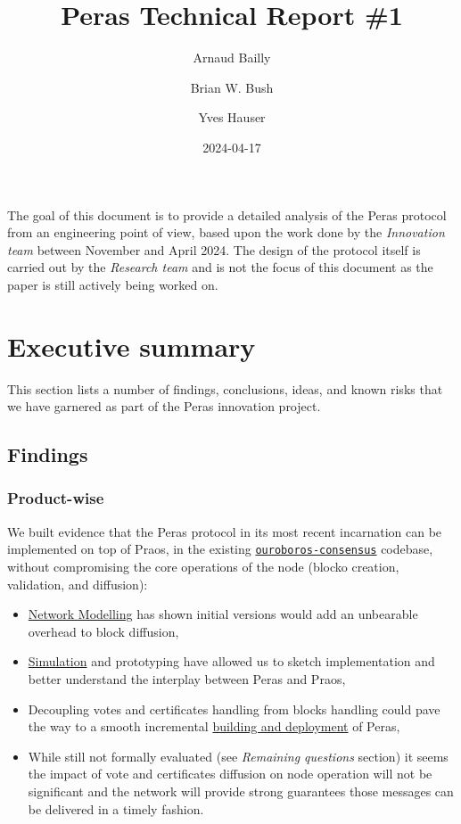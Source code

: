 \documentclass[10pt]{article}
\title{Peras Technical Report \#1}
\author{Arnaud Bailly \and Brian W. Bush \and Yves Hauser}
\date{2024-04-17}
\providecommand{\tightlist}{%
  \setlength{\itemsep}{0pt}\setlength{\parskip}{0pt}}
\begin{document}
\maketitle

{
\setcounter{tocdepth}{3}
\tableofcontents
\newpage
}
The goal of this document is to provide a detailed analysis of the Peras
protocol from an engineering point of view, based upon the work done by
the \emph{Innovation team} between November and April 2024. The design
of the protocol itself is carried out by the \emph{Research team} and is
not the focus of this document as the paper is still actively being
worked on.

\section{Executive summary}\label{executive-summary}

This section lists a number of findings, conclusions, ideas, and known
risks that we have garnered as part of the Peras innovation project.

\subsection{Findings}\label{findings}

\subsubsection{Product-wise}\label{product-wise}

We built evidence that the Peras protocol in its most recent incarnation
can be implemented on top of Praos, in the existing
\href{https://github.com/IntersectMBO/ouroboros-consensus}{\color{blue}\texttt{ouroboros-consensus}}
codebase, without compromising the core operations of the node (blocko
creation, validation, and diffusion):

\begin{itemize}
\tightlist
\item
  \hyperref[network-performance-analysis]{Network Modelling} has shown
  initial versions would add an unbearable overhead to block diffusion,
\item
  \hyperref[simulations]{Simulation} and prototyping have allowed us to
  sketch implementation and better understand the interplay between
  Peras and Praos,
\item
  Decoupling votes and certificates handling from blocks handling could
  pave the way to a smooth incremental
  \hyperref[integration-into-cardano-node]{building and deployment} of
  Peras,
\item
  While still not formally evaluated (see \emph{Remaining questions}
  section) it seems the impact of vote and certificates diffusion on
  node operation will not be significant and the network will provide
  strong guarantees those messages can be delivered in a timely fashion.
\end{itemize}
\end{document}
